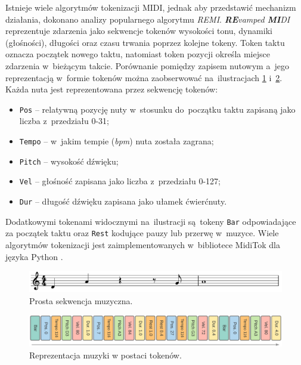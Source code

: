 \documentclass[data-science]{agh-wi} %
\begin{document}
Istnieje wiele algorytmów tokenizacji MIDI, jednak aby przedstawić mechanizm działania, dokonano analizy popularnego algorytmu \textit{REMI}. \textit{\textbf{RE}vamped \textbf{MI}DI} reprezentuje zdarzenia jako sekwencje tokenów wysokości tonu, dynamiki (głośności), długości oraz czasu trwania poprzez kolejne tokeny. Token taktu oznacza początek nowego taktu, natomiast token pozycji określa miejsce zdarzenia w~bieżącym takcie. Porównanie pomiędzy zapisem nutowym a~jego reprezentacją w~formie tokenów można zaobserwować na~ilustracjach \ref*{fig:remi_notes} i~\ref*{fig:remi_tokens}. Każda nuta jest reprezentowana przez sekwencję tokenów:
\begin{itemize}
    \item \texttt{Pos} -- relatywną pozycję nuty w~stosunku do~początku taktu zapisaną jako liczba z~przedziału 0-31;
    \item \texttt{Tempo} -- w~jakim tempie (\textit{bpm}) nuta została zagrana;
    \item \texttt{Pitch} -- wysokość dźwięku;
    \item \texttt{Vel} -- głośność zapisana jako liczba z~przedziału 0-127;
    \item \texttt{Dur} -- długość dźwięku zapisana jako ułamek ćwierćnuty.
\end{itemize}
Dodatkowymi tokenami widocznymi na~ilustracji są~tokeny \texttt{Bar} odpowiadające za początek taktu oraz \texttt{Rest} kodujące pauzy lub przerwę w~muzyce. Wiele algorytmów tokenizacji jest zaimplementowanych w~bibliotece MidiTok dla języka Python \cite{miditok2021}.

\begin{figure}[ht!]
    \begin{center}
        \includegraphics[width=0.9\linewidth]{./img/tokenizer_notes.pdf}
    \end{center}
    \caption{Prosta sekwencja muzyczna.}\label{fig:remi_notes}
\end{figure}

\begin{figure}[ht!]
    \begin{center}
        \includegraphics[width=0.9\linewidth]{./img/remi.png}
    \end{center}
    \caption{Reprezentacja muzyki w postaci tokenów.}\label{fig:remi_tokens}
\end{figure}
\end{document}
